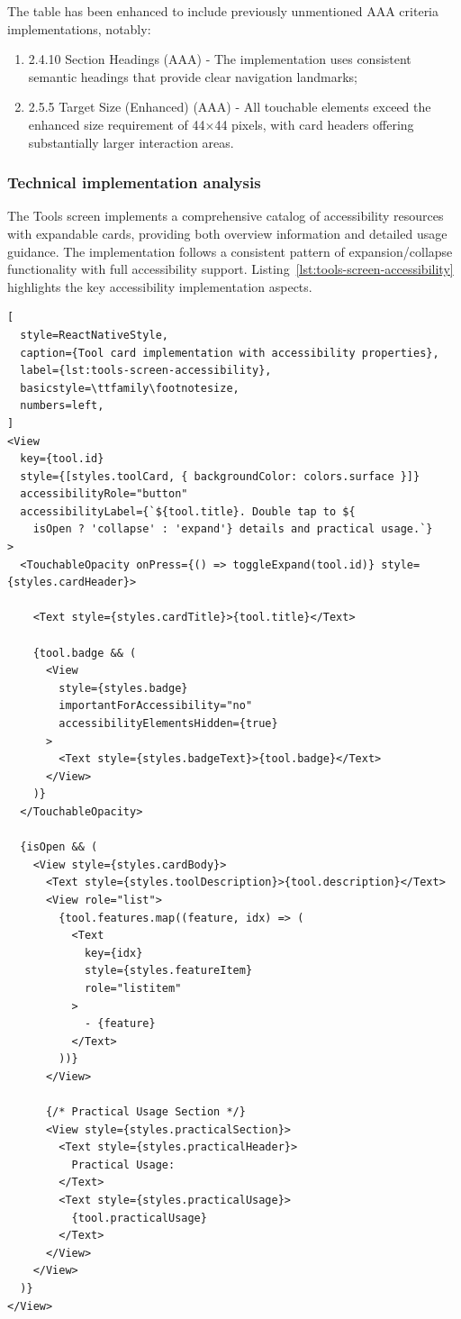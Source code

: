 The table has been enhanced to include previously unmentioned AAA criteria implementations, notably:

\begin{enumerate}
    \item 2.4.10 Section Headings (AAA) - The implementation uses consistent semantic headings that provide clear navigation landmarks;
    
    \item 2.5.5 Target Size (Enhanced) (AAA) - All touchable elements exceed the enhanced size requirement of 44×44 pixels, with card headers offering substantially larger interaction areas.
\end{enumerate}

\subsubsection{Technical implementation analysis}

The Tools screen implements a comprehensive catalog of accessibility resources with expandable cards, providing both overview information and detailed usage guidance. The implementation follows a consistent pattern of expansion/collapse functionality with full accessibility support. Listing~\ref{lst:tools-screen-accessibility} highlights the key accessibility implementation aspects.

\begin{lstlisting}[
  style=ReactNativeStyle,
  caption={Tool card implementation with accessibility properties},
  label={lst:tools-screen-accessibility},
  basicstyle=\ttfamily\footnotesize,
  numbers=left,
]
<View
  key={tool.id}
  style={[styles.toolCard, { backgroundColor: colors.surface }]}
  accessibilityRole="button"
  accessibilityLabel={`${tool.title}. Double tap to ${
    isOpen ? 'collapse' : 'expand'} details and practical usage.`}
>
  <TouchableOpacity onPress={() => toggleExpand(tool.id)} style={styles.cardHeader}>
    
    <Text style={styles.cardTitle}>{tool.title}</Text>
    
    {tool.badge && (
      <View 
        style={styles.badge} 
        importantForAccessibility="no" 
        accessibilityElementsHidden={true}
      >
        <Text style={styles.badgeText}>{tool.badge}</Text>
      </View>
    )}
  </TouchableOpacity>

  {isOpen && (
    <View style={styles.cardBody}>
      <Text style={styles.toolDescription}>{tool.description}</Text>
      <View role="list">
        {tool.features.map((feature, idx) => (
          <Text 
            key={idx} 
            style={styles.featureItem} 
            role="listitem"
          >
            - {feature}
          </Text>
        ))}
      </View>
      
      {/* Practical Usage Section */}
      <View style={styles.practicalSection}>
        <Text style={styles.practicalHeader}>
          Practical Usage:
        </Text>
        <Text style={styles.practicalUsage}>
          {tool.practicalUsage}
        </Text>
      </View>
    </View>
  )}
</View>
\end{lstlisting}
\FloatBarrier

